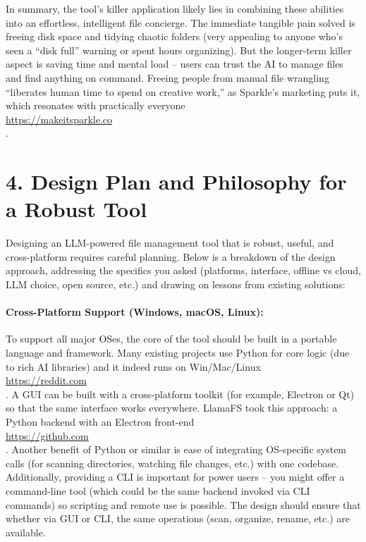 \documentclass[11pt]{article}
\begin{document}
In summary, the tool’s killer application likely lies in combining these abilities into an effortless, intelligent file concierge. The immediate tangible pain solved is freeing disk space and tidying chaotic folders (very appealing to anyone who’s seen a “disk full” warning or spent hours organizing). But the longer-term killer aspect is saving time and mental load -- users can trust the AI to manage files and find anything on command. Freeing people from manual file wrangling “liberates human time to spend on creative work,” as Sparkle’s marketing puts it, which resonates with practically everyone \\ \url{https://makeitsparkle.co} \\ .

\section{4. Design Plan and Philosophy for a Robust Tool}
Designing an LLM-powered file management tool that is robust, useful, and cross-platform requires careful planning. Below is a breakdown of the design approach, addressing the specifics you asked (platforms, interface, offline vs cloud, LLM choice, open source, etc.) and drawing on lessons from existing solutions:

\paragraph{Cross-Platform Support (Windows, macOS, Linux):} To support all major OSes, the core of the tool should be built in a portable language and framework. Many existing projects use Python for core logic (due to rich AI libraries) and it indeed runs on Win/Mac/Linux \\ \url{https://reddit.com} \\ . A GUI can be built with a cross-platform toolkit (for example, Electron or Qt) so that the same interface works everywhere. LlamaFS took this approach: a Python backend with an Electron front-end \\ \url{https://github.com} \\ . Another benefit of Python or similar is ease of integrating OS-specific system calls (for scanning directories, watching file changes, etc.) with one codebase. Additionally, providing a CLI is important for power users -- you might offer a command-line tool (which could be the same backend invoked via CLI commands) so scripting and remote use is possible. The design should ensure that whether via GUI or CLI, the same operations (scan, organize, rename, etc.) are available.
\end{document}
